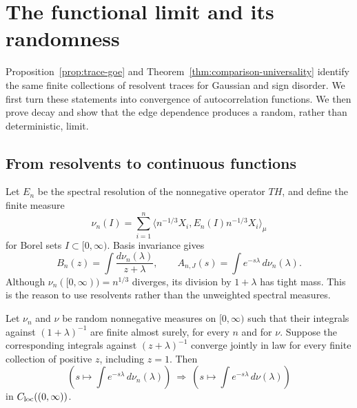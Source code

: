 \section{The functional limit and its randomness}
\label{sec:functional}

Proposition~\ref{prop:trace-goe} and
Theorem~\ref{thm:comparison-universality} identify the same finite
collections of resolvent traces for Gaussian and sign disorder.
We first turn these statements into convergence of autocorrelation
functions.  We then prove decay and show that the edge dependence
produces a random, rather than deterministic, limit.

\subsection{From resolvents to continuous functions}

Let $E_n$ be the spectral resolution of the nonnegative operator $TH$,
and define the finite measure
\[
 \nu_n(I)=\sum_{i=1}^n
 \langle n^{-1/3}X_i,E_n(I)n^{-1/3}X_i\rangle_\mu
\]
for Borel sets $I\subset[0,\infty)$.  Basis invariance gives
\[
 B_n(z)=\int\frac{d\nu_n(\lambda)}{z+\lambda},
 \qquad
 A_{n,J}(s)=\int e^{-s\lambda}\,d\nu_n(\lambda).
\]
Although $\nu_n([0,\infty))=n^{1/3}$ diverges, its division by
$1+\lambda$ has tight mass.  This is the reason to use resolvents
rather than the unweighted spectral measures.

\begin{lemma}
\label{lem:functional-spectral}
Let $\nu_n$ and $\nu$ be random nonnegative measures on $[0,\infty)$
such that their integrals against $(1+\lambda)^{-1}$ are finite almost
surely, for every $n$ and for $\nu$.
Suppose the corresponding integrals against $(z+\lambda)^{-1}$
converge jointly in law for every finite collection of positive $z$,
including $z=1$.  Then
\[
 \left(s\longmapsto\int e^{-s\lambda}\,d\nu_n(\lambda)\right)
 \ \Longrightarrow\
 \left(s\longmapsto\int e^{-s\lambda}\,d\nu(\lambda)\right)
\]
in $C_{\rm loc}((0,\infty))$.
\end{lemma}

